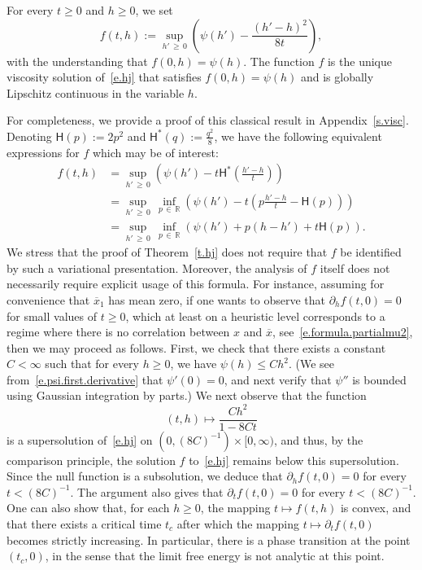 \documentclass[AHL,Unicode,longabstracts,published]{cedram}
\newcommand{\R}{\mathbb{R}}
\newcommand{\sfH}{\mathsf{H}}
\newcommand{\1}{\mathds{1}}
\renewcommand{\le}{\leqslant}
\renewcommand{\ge}{\geqslant}
\renewcommand{\bar}{\overline}
\begin{document}
\begin{prop}\label{p.hopf-lax}
For every $t \ge 0$ and $h \ge 0$, we set
\begin{equation}\label{e.hopf-lax}
f(t,h) := \sup_{h'\,\ge\,0} \left(\psi({h}') - \frac{({h}' - {h})^2}{8t} \right),
\end{equation}
with the understanding that $f(0,h) = \psi(h)$. The function $f$ is the unique viscosity solution of~\eqref{e.hj} that satisfies $f(0,h) = \psi(h)$ and is globally Lipschitz continuous in the variable $h$.
\end{prop}

For completeness, we provide a proof of this classical result in Appendix~\ref{s.visc}. Denoting $\sfH(p) := 2p^2$ and $\sfH^*(q) := \frac{q^2}{8}$, we have the following equivalent expressions for $f$ which may be of interest:
\begin{align*}
f(t,h) & = \sup_{h'\,\ge\,0} \left(\psi({h}') - t \sfH^* \left(\frac{{h}' - {h}}{t} \right) \right) \\
& = \sup_{h'\,\ge\,0} \, \inf_{p\,\in\,\R} \left(\psi(h') - t \left(p \frac{h'-h}{t} - \sfH(p) \right) \right) \\
& = \sup_{h'\,\ge\,0} \, \inf_{p\,\in\,\R} \left(\psi(h') + p (h-h') + t \sfH(p) \right).
\end{align*}
We stress that the proof of Theorem~\ref{t.hj} does not require that $f$ be identified by such a variational presentation. Moreover, the analysis of $f$ itself does not necessarily require explicit usage of this formula. For instance, assuming for convenience that $\bar x_1$ has mean zero, if one wants to observe that $\partial_h f(t,0) = 0$ for small values of $t \ge 0$, which at least on a heuristic level corresponds to a regime where there is no correlation between $x$ and $\bar x$, see~\eqref{e.formula.partialmu2}, then we may proceed as follows. First, we check that there exists a constant $C < \infty$ such that for every $h \ge 0$, we have $\psi(h) \le C h^2$. (We see from~\eqref{e.psi.first.derivative} that $\psi'(0) = 0$, and next verify that $\psi''$ is bounded using Gaussian integration by parts.) We next observe that the function
\[
(t,h) \mapsto \frac{C h^2}{1-8Ct}
\]
is a supersolution of~\eqref{e.hj} on $(0,(8C)^{-1})\times [0,\infty)$, and thus, by the comparison principle, the solution $f$ to~\eqref{e.hj} remains below this supersolution. Since the null function is a subsolution, we deduce that $\partial_h f(t,0) = 0$ for every $t <(8C)^{-1}$. The argument also gives that $\partial_t f(t,0) = 0$ for every $t < (8C)^{-1}$. One can also show that, for each $h \ge 0$, the mapping $t \mapsto f(t,h)$ is convex, and that there exists a critical time $t_c$ after which the mapping $t \mapsto \partial_t f(t,0)$ becomes strictly increasing. In particular, there is a phase transition at the point $(t_c,0)$, in the sense that the limit free energy is not analytic at this point.
\end{document}
